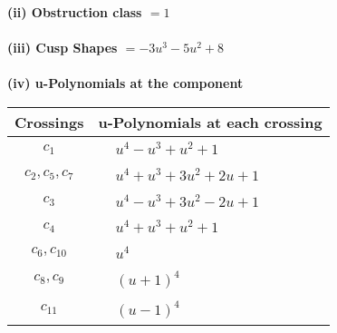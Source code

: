 \documentclass[1p]{elsarticle_modified}
\theoremstyle{definition}
\begin{document}
\flushleft \textbf{(ii) Obstruction class $= 1$}\\~\\
\flushleft \textbf{(iii) Cusp Shapes $= -3 u^3-5 u^2+8$}\\~\\
\newpage\renewcommand{\arraystretch}{1}
\flushleft \textbf{(iv) u-Polynomials at the component}\newline \\
\begin{tabular}{m{50pt}|m{274pt}}
Crossings & \hspace{64pt}u-Polynomials at each crossing \\
\hline $$\begin{aligned}c_{1}\end{aligned}$$&$\begin{aligned}
&u^4- u^3+u^2+1
\end{aligned}$\\
\hline $$\begin{aligned}c_{2},c_{5},c_{7}\end{aligned}$$&$\begin{aligned}
&u^4+u^3+3 u^2+2 u+1
\end{aligned}$\\
\hline $$\begin{aligned}c_{3}\end{aligned}$$&$\begin{aligned}
&u^4- u^3+3 u^2-2 u+1
\end{aligned}$\\
\hline $$\begin{aligned}c_{4}\end{aligned}$$&$\begin{aligned}
&u^4+u^3+u^2+1
\end{aligned}$\\
\hline $$\begin{aligned}c_{6},c_{10}\end{aligned}$$&$\begin{aligned}
&u^4
\end{aligned}$\\
\hline $$\begin{aligned}c_{8},c_{9}\end{aligned}$$&$\begin{aligned}
&(u+1)^4
\end{aligned}$\\
\hline $$\begin{aligned}c_{11}\end{aligned}$$&$\begin{aligned}
&(u-1)^4
\end{aligned}$\\
\hline
\end{tabular}\\~\\
\end{document}
